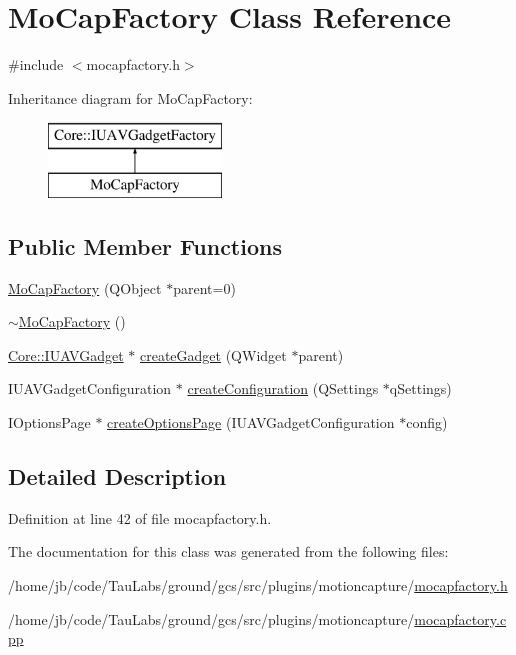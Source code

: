 \hypertarget{class_mo_cap_factory}{\section{\-Mo\-Cap\-Factory \-Class \-Reference}
\label{class_mo_cap_factory}
}


{\ttfamily \#include $<$mocapfactory.\-h$>$}

\-Inheritance diagram for \-Mo\-Cap\-Factory\-:\begin{figure}[H]
\begin{center}
\leavevmode
\includegraphics[height=2.000000cm]{class_mo_cap_factory}
\end{center}
\end{figure}
\subsection*{\-Public \-Member \-Functions}
\begin{DoxyCompactItemize}
\item 
\hyperlink{group___mo_cap_plugin_ga4c5fc1e339794bad8a5ad59687380db0}{\-Mo\-Cap\-Factory} (\-Q\-Object $\ast$parent=0)
\item 
\hyperlink{group___mo_cap_plugin_gae7570bd6937d0e589152551bd0ff5cf1}{$\sim$\-Mo\-Cap\-Factory} ()
\item 
\hyperlink{class_core_1_1_i_u_a_v_gadget}{\-Core\-::\-I\-U\-A\-V\-Gadget} $\ast$ \hyperlink{group___mo_cap_plugin_ga4a3cc25be4de282c2017c0e9db77e31d}{create\-Gadget} (\-Q\-Widget $\ast$parent)
\item 
\-I\-U\-A\-V\-Gadget\-Configuration $\ast$ \hyperlink{group___mo_cap_plugin_gacb27abd92b935f31e14c22c97795e4e6}{create\-Configuration} (\-Q\-Settings $\ast$q\-Settings)
\item 
\-I\-Options\-Page $\ast$ \hyperlink{group___mo_cap_plugin_gaea471065fa9f7d73e26e9b744f2bb117}{create\-Options\-Page} (\-I\-U\-A\-V\-Gadget\-Configuration $\ast$config)
\end{DoxyCompactItemize}


\subsection{\-Detailed \-Description}


\-Definition at line 42 of file mocapfactory.\-h.



\-The documentation for this class was generated from the following files\-:\begin{DoxyCompactItemize}
\item 
/home/jb/code/\-Tau\-Labs/ground/gcs/src/plugins/motioncapture/\hyperlink{mocapfactory_8h}{mocapfactory.\-h}\item 
/home/jb/code/\-Tau\-Labs/ground/gcs/src/plugins/motioncapture/\hyperlink{mocapfactory_8cpp}{mocapfactory.\-cpp}\end{DoxyCompactItemize}

